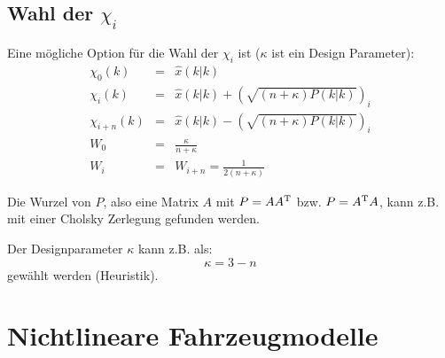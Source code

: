 \subsection{Wahl der $\chi_i$}
Eine mögliche Option für die Wahl der $\chi_i$ ist ($\kappa$ ist ein Design Parameter):
\begin{eqnarray*}
    \chi_0(k) &=& \hat{x}(k|k) \\
    \chi_{i}(k) &=& \hat{x}(k|k) + {\left( \sqrt{(n+\kappa) P(k|k)} \right)}_i \\
    \chi_{i+n}(k) &=& \hat{x}(k|k) - {\left( \sqrt{(n+\kappa) P(k|k)} \right)}_i \\
    W_0 &=& \frac{\kappa}{n + \kappa} \\
    W_i &=& W_{i+n} = \frac{1}{2 (n + \kappa)} 
\end{eqnarray*}

Die Wurzel von $P$, also eine Matrix $A$ mit $P=AA^\text{T}$ bzw. $P=A^\text{T}A$, kann z.B. mit einer Cholsky Zerlegung gefunden
werden.

Der Designparameter $\kappa$ kann z.B. als:
\begin{equation*}
    \kappa = 3 - n
\end{equation*}
gewählt werden (Heuristik).

\section{Nichtlineare Fahrzeugmodelle}

